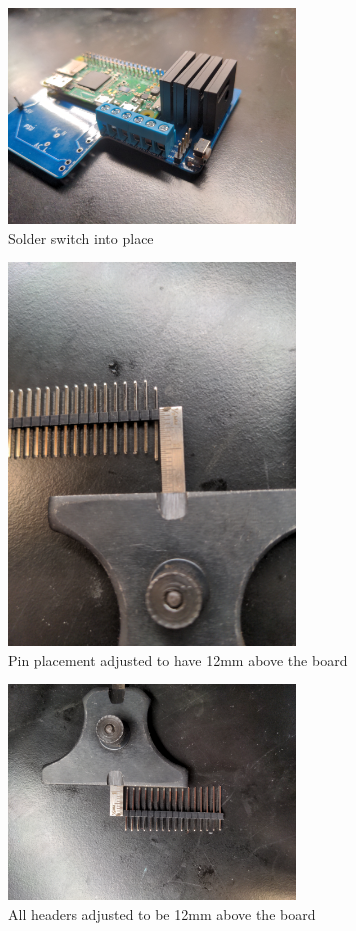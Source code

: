 \begin{figure}
  \centering
  \includegraphics[width=3in]{img/switch.jpg}
  \caption{Solder switch into place}
  \label{fig:switch}
\end{figure}
\begin{figure}
  \centering
  \includegraphics[width=3in]{img/modified_header.jpg}
  \caption{Pin placement adjusted to have 12mm above the board}
  \label{fig:header}
\end{figure}
\begin{figure}
  \centering
  \includegraphics[width=3in]{img/modified_headers.jpg}
  \caption{All headers adjusted to be 12mm above the board}
  \label{fig:headers}
\end{figure}
